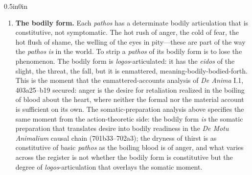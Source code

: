 \begin{adjustwidth}{0.5in}{0in}
\begin{enumerate}
        \item \textbf{The bodily form.} Each \textit{pathos} has a determinate bodily articulation that is constitutive, not symptomatic. The hot rush of anger, the cold of fear, the hot flush of shame, the welling of the eyes in pity---these are part of the way the \textit{pathos} \textit{is} in the world. To strip a \textit{pathos} of its bodily form is to lose the phenomenon. The bodily form is \textit{logos}-articulated: it has the \textit{eidos} of the slight, the threat, the fall, but it is enmattered, meaning-bodily-bodied-forth. This is the moment that the enmattered-accounts analysis of \textit{De Anima} I.1, 403a25--b19 secured: anger is the desire for retaliation realized in the boiling of blood about the heart, where neither the formal nor the material account is sufficient on its own. The somatic-preparation analysis above specifies the same moment from the action-theoretic side: the bodily form \textit{is} the somatic preparation that translates desire into bodily readiness in the \textit{De Motu Animalium} causal chain (701b33--702a3); the dryness of thirst is as constitutive of basic \textit{pathos} as the boiling blood is of anger, and what varies across the register is not whether the bodily form is constitutive but the degree of \textit{logos}-articulation that overlays the somatic moment.
        

\end{enumerate}
\end{adjustwidth}
